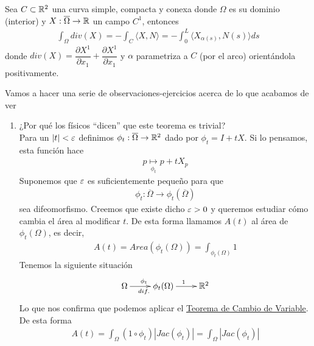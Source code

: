 \begin{teo}\label{teo:divergencia}
    Sea $C\subset \mathbb{R}^2$ una curva simple, compacta y conexa donde $\Omega$ es su dominio (interior) y $X: \overline{\Omega} \to \mathbb{R}$ un campo $C^1$, entonces
    \begin{gather*}
        \int_\Omega div(X) = -\int_C \langle X, N \rangle = -\int_0^L \langle X_{\alpha(s)}, N(s) \rangle ds
    \end{gather*}
    donde $div(X)= \dfrac{\partial X^1}{\partial x_1} + \dfrac{\partial X^1}{\partial x_1}$ y $\alpha$ parametriza a $C$ (por el arco) orientándola positivamente.
\end{teo}

\begin{observacion}
    Vamos a hacer una serie de observaciones-ejercicios acerca de lo que acabamos de ver
    \begin{enumerate}
        \item ¿Por qué los físicos ``dicen'' que este teorema es trivial?\\
        Para un $|t|<\varepsilon$ definimos $\phi_t : \overline{\Omega} \to \mathbb{R}^2$ dado por $\phi_t=I+tX$. Si lo pensamos, esta función hace
        \begin{gather*}
            p \underset{\phi_t}{\mapsto} p +t X_p
        \end{gather*}
        Suponemos que $\varepsilon$ es suficientemente pequeño para que 
        \begin{gather*}
            \phi_t : \overline{\Omega} \to \phi_t(\overline{\Omega})
        \end{gather*}
        sea difeomorfismo. Creemos que existe dicho $\varepsilon>0$ y queremos estudiar cómo cambia el área al modificar $t$. De esta forma llamamos $A(t)$ al área de $\phi_t(\Omega)$, es decir,
        \begin{gather*}
            A(t) = Area(\phi_t(\Omega)) = \int_{\phi_t(\Omega)} 1
        \end{gather*}
        Tenemos la siguiente situación
        \begin{gather*}
            \xymatrix{
                \Omega \ar[r]^{\phi_t}_{dif.} & \phi_t(\Omega) \ar[r]^1 &\bb{R}^2
            }
        \end{gather*}
        Lo que nos confirma que podemos aplicar el \hyperref[teo:cambio_variable]{Teorema de Cambio de Variable}. De esta forma
        \begin{gather*}
            A(t) = \int_\Omega (1\circ \phi_t)|Jac(\phi_t)| = \int_\Omega |Jac(\phi_t)|

\end{gather*}
\end{enumerate}
\end{observacion}
